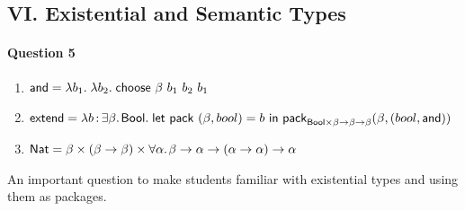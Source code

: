 \documentclass[11pt,a4paper,twoside]{article}
\begin{document}
\subsection*{VI. Existential and Semantic Types}

\paragraph*{Question 5}
\begin{enumerate}[label=(\alph*)]
  \item $\mathsf{and} = \lambda b_1.\; \lambda b_2.\; \mathsf{choose}\ \beta\ b_1\ b_2\ b_1 $
  \item $\mathsf{extend} = \lam{b}{\exist{\beta}{\Bool}}{
    \mathsf{let\ pack}\ (\beta, bool) = b\  \mathsf{in}\ 
    \pack{\Bool \times \beta \to \beta \to \beta}{\beta}{(bool, \mathsf{and})}} $
  \item $\mathsf{Nat} = \beta \times (\beta \to \beta) \times 
    \forall \alpha .\;\! \beta \to \alpha \to (\alpha \to \alpha) \to \alpha $
\end{enumerate}
%
An important question to make students familiar with existential types and using them as 
packages.
\end{document}
